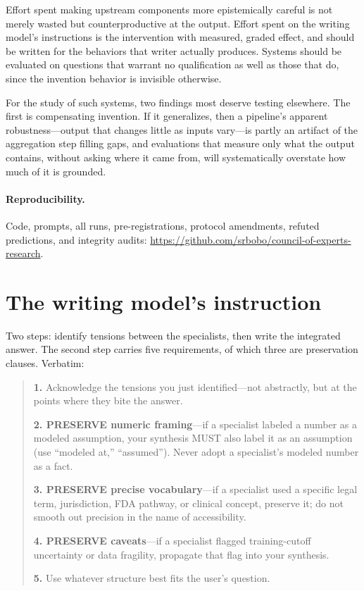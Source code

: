 \documentclass[11pt]{article}
\begin{document}
 Effort spent
making upstream components more epistemically careful is not merely wasted but
counterproductive at the output. Effort spent on the writing model's
instructions is the intervention with measured, graded effect, and should be
written for the behaviors that writer actually produces. Systems should be
evaluated on questions that warrant no qualification as well as those that
do, since the invention behavior is invisible otherwise.

For the study of such systems, two findings most deserve testing elsewhere.
The first is compensating invention. If it generalizes, then a pipeline's
apparent robustness---output that changes little as inputs vary---is partly an
artifact of the aggregation step filling gaps, and evaluations that measure
only what the output contains, without asking where it came from, will
systematically overstate how much of it is grounded.

\paragraph{Reproducibility.} Code, prompts, all runs, pre-registrations,
protocol amendments, refuted predictions, and integrity audits:
\url{https://github.com/srbobo/council-of-experts-research}.

\appendix

\section{The writing model's instruction}
\label{app:prompt}
Two steps: identify tensions between the specialists, then write the
integrated answer. The second step carries five requirements, of which three
are preservation clauses. Verbatim:

\begin{quote}\small
\textbf{1.} Acknowledge the tensions you just identified---not abstractly, but
at the points where they bite the answer.

\textbf{2. PRESERVE numeric framing}---if a specialist labeled a number as a
modeled assumption, your synthesis MUST also label it as an assumption (use
``modeled at,'' ``assumed''). Never adopt a specialist's modeled number as a
fact.

\textbf{3. PRESERVE precise vocabulary}---if a specialist used a specific legal
term, jurisdiction, FDA pathway, or clinical concept, preserve it; do not
smooth out precision in the name of accessibility.

\textbf{4. PRESERVE caveats}---if a specialist flagged training-cutoff
uncertainty or data fragility, propagate that flag into your synthesis.

\textbf{5.} Use whatever structure best fits the user's question.
\end{quote}
\end{document}
